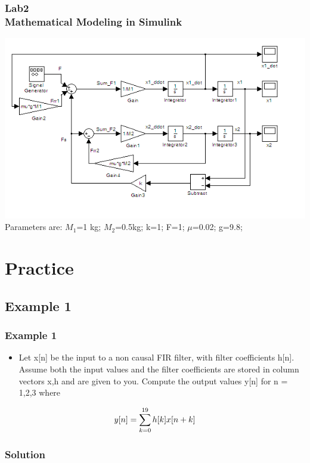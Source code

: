 \documentclass[hyperref={pdfpagelabels=true}]{beamer}
\begin{document}
\begin{frame}
\frametitle{Lab2 \\{\large Mathematical Modeling in Simulink}}
\includegraphics[scale = 0.52]{figs/Selection_039.png}
\\
Parameters are:
$M_1$=1 kg; $M_2$=0.5kg; k=1; F=1; $\mu$=0.02; g=9.8; 
\end{frame}








\section{Practice}
\subsection{Example 1} 

\begin{frame}[fragile]
\frametitle{Example 1}
\begin{itemize}
\item[\ding{89}] Let x[n] be the input to a non causal FIR filter, with filter
coefficients h[n]. Assume both the input values and the filter
coefficients are stored in column vectors x,h and are given to
you. Compute the output values y[n] for n = 1,2,3 where
\end{itemize}
\begin{align*}
\centering
y[n]=\sum_{k=0}^{19}h[k]x[n+k]
\end{align*}
\end{frame}

\subsubsection{Solution}
\end{document}
